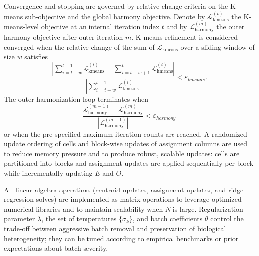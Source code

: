 \documentclass{article}
\begin{document}
Convergence and stopping are governed by relative-change criteria on the K-means sub-objective and the global harmony objective. Denote by $\mathcal{L}_{\mathrm{kmeans}}^{(t)}$ the K-means-level objective at an internal iteration index $t$ and by $\mathcal{L}_{\mathrm{harmony}}^{(m)}$ the outer harmony objective after outer iteration $m$. K-means refinement is considered converged when the relative change of the sum of $\mathcal{L}_{\mathrm{kmeans}}$ over a sliding window of size $w$ satisfies
\begin{equation}
    \frac{\left| \sum_{i=t-w}^{t-1} \mathcal{L}_{\mathrm{kmeans}}^{(i)} - \sum_{i=t-w+1}^{t} \mathcal{L}_{\mathrm{kmeans}}^{(i)} \right|}{\left| \sum_{i=t-w}^{t-1} \mathcal{L}_{\mathrm{kmeans}}^{(i)} \right|} < \varepsilon_{kmeans}.
\end{equation}
The outer harmonization loop terminates when
\begin{equation}
    \frac{\mathcal{L}_{\mathrm{harmony}}^{(m-1)} - \mathcal{L}_{\mathrm{harmony}}^{(m)}}{\left| \mathcal{L}_{\mathrm{harmony}}^{(m-1)} \right|} < \varepsilon_{harmony}
\end{equation}
or when the pre-specified maximum iteration counts are reached. A randomized update ordering of cells and block-wise updates of assignment columns are used to reduce memory pressure and to produce robust, scalable updates: cells are partitioned into blocks and assignment updates are applied sequentially per block while incrementally updating $E$ and $O$.

All linear-algebra operations (centroid updates, assignment updates, and ridge regression solves) are implemented as matrix operations to leverage optimized numerical libraries and to maintain scalability when $N$ is large. Regularization parameter $\lambda$, the set of temperatures $\{\sigma_k\}$, and batch coefficients $\theta$ control the trade-off between aggressive batch removal and preservation of biological heterogeneity; they can be tuned according to empirical benchmarks or prior expectations about batch severity.
\end{document}
